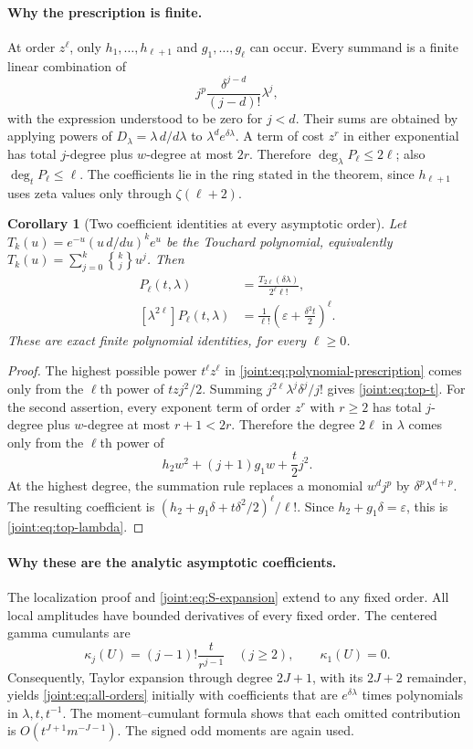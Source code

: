 \documentclass[11pt,a4paper]{article}
\numberwithin{equation}{section}
\theoremstyle{plain}
\newtheorem{corollary}[theorem]{Corollary}
\theoremstyle{definition}
\theoremstyle{remark}
\begin{document}
\paragraph{Why the prescription is finite.}
At order $z^\ell$, only $h_1,\ldots,h_{\ell+1}$ and
$g_1,\ldots,g_\ell$ can occur. Every summand is a finite linear
combination of
\[
 j^p\frac{\delta^{j-d}}{(j-d)!}\lambda^j,
\]
with the expression understood to be zero for $j<d$.
Their sums are obtained by applying powers of
$D_\lambda=\lambda\,d/d\lambda$ to
$\lambda^d e^{\delta\lambda}$.
A term of cost $z^r$ in either exponential has total $j$-degree plus
$w$-degree at most $2r$. Therefore
$\deg_\lambda P_\ell\leq2\ell$; also
$\deg_tP_\ell\leq\ell$. The coefficients lie in the ring stated in
the theorem, since $h_{\ell+1}$ uses zeta values only through
$\zeta(\ell+2)$.

\begin{corollary}[Two coefficient identities at every asymptotic order]
\label{joint:cor:top-coefficients}
Let $T_k(u)=e^{-u}(u\,d/du)^ke^u$ be the Touchard polynomial,
equivalently $T_k(u)=\sum_{j=0}^k\genfrac{\{}{\}}{0pt}{}{k}{j}u^j$. Then
\begin{align}
 [t^\ell]P_\ell(t,\lambda)
   &=\frac{T_{2\ell}(\delta\lambda)}{2^\ell\ell!},\label{joint:eq:top-t}\\
 [\lambda^{2\ell}]P_\ell(t,\lambda)
   &=\frac1{\ell!}
           \left(\varepsilon+\frac{\delta^2t}{2}\right)^\ell.
 \label{joint:eq:top-lambda}
\end{align}
These are exact finite polynomial identities, for every $\ell\geq0$.
\end{corollary}
\begin{proof}
The highest possible power $t^\ell z^\ell$ in
\eqref{joint:eq:polynomial-prescription} comes only from the $\ell$th
power of $tzj^2/2$. Summing $j^{2\ell}\lambda^j\delta^j/j!$
gives \eqref{joint:eq:top-t}.
For the second assertion, every exponent term of order $z^r$ with
$r\geq2$ has total $j$-degree plus $w$-degree at most $r+1<2r$.
Therefore the degree $2\ell$ in $\lambda$ comes only from the
$\ell$th power of
\[
 h_2w^2+(j+1)g_1w+\frac t2j^2.
\]
At the highest degree, the summation rule replaces a monomial
$w^dj^p$ by $\delta^p\lambda^{d+p}$.
The resulting coefficient is
$(h_2+g_1\delta+t\delta^2/2)^\ell/\ell!$.
Since $h_2+g_1\delta=\varepsilon$, this is
\eqref{joint:eq:top-lambda}.
\end{proof}

\paragraph{Why these are the analytic asymptotic coefficients.}
The localization proof and \eqref{joint:eq:S-expansion} extend to any
fixed order. All local amplitudes have bounded derivatives of every
fixed order. The centered gamma cumulants are
\[
 \kappa_j(U)=(j-1)!\frac{t}{r^{j-1}}\quad(j\geq2),\qquad\kappa_1(U)=0.
\]
Consequently, Taylor expansion through degree $2J+1$, with its
$2J+2$ remainder, yields \eqref{joint:eq:all-orders} initially with
coefficients that are $e^{\delta\lambda}$ times polynomials in
$\lambda,t,t^{-1}$. The moment--cumulant formula shows that each
omitted contribution is $O(t^{J+1}m^{-J-1})$. The signed odd moments
are again used.
\end{document}
